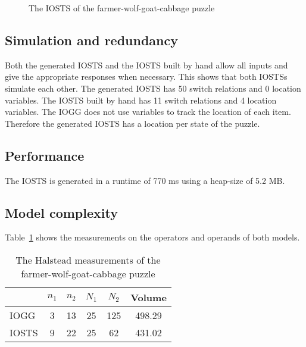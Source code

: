 \begin{figure}[ht]
  \begin{center}
    
  \end{center}
  \caption{The IOSTS of the farmer-wolf-goat-cabbage puzzle}
  \label{fig:sts-fwgc}
\end{figure}

\subsection{Simulation and redundancy}
Both the generated IOSTS and the IOSTS built by hand allow all inputs and give the appropriate responses when necessary. This shows that both IOSTSs simulate each other. The generated IOSTS has 50 switch relations and 0 location variables. The IOSTS built by hand has 11 switch relations and 4 location variables. The IOGG does not use variables to track the location of each item. Therefore the generated IOSTS has a location per state of the puzzle. 

\subsection{Performance}
The IOSTS is generated in a runtime of 770 ms using a heap-size of 5.2 MB.

\subsection{Model complexity}
\begin{comment}
start: 12 new operands, 26 operands
?c: 3 new operators, 0 new operands. 5 operators, 17 operands
?c-invalid: 0 new operators, 1 new operand. 2 operators, 14 operands
!retry: 0-0. 1 operator, 2 operands.
!eaten: 0-0. 9 operators, 36 operands
!done: 8 operators, 30 operands
\end{comment}

Table~\ref{tab:halstead-fwgc} shows the measurements on the operators and operands of both models.

\begin{table}[ht]
\begin{center}
\begin{tabular}{| l | c | c | c | c | c |}
  \hline
  & $n_1$ & $n_2$ & $N_1$ & $N_2$ & Volume \\ \hline
  IOGG & 3 & 13 & 25 & 125 & 498.29 \\ \hline
  IOSTS & 9 & 22 & 25 & 62 & 431.02 \\
  \hline
\end{tabular}
\end{center}
\caption{The Halstead measurements of the farmer-wolf-goat-cabbage puzzle}
\label{tab:halstead-fwgc}
\end{table}


